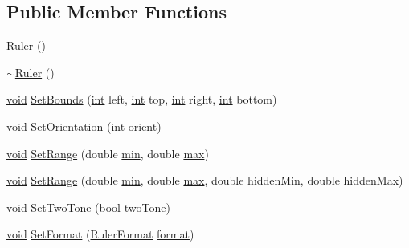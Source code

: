 \subsection*{Public Member Functions}
\begin{DoxyCompactItemize}
\item 
\hyperlink{class_ruler_a758f797ec166b06b7987f71d09c2a311}{Ruler} ()
\item 
\hyperlink{class_ruler_adfd931f9040a611cdc8f7bc75c819c60}{$\sim$\+Ruler} ()
\item 
\hyperlink{sound_8c_ae35f5844602719cf66324f4de2a658b3}{void} \hyperlink{class_ruler_ac0cd3f26225eb23922e5c6399b39a2aa}{Set\+Bounds} (\hyperlink{xmltok_8h_a5a0d4a5641ce434f1d23533f2b2e6653}{int} left, \hyperlink{xmltok_8h_a5a0d4a5641ce434f1d23533f2b2e6653}{int} top, \hyperlink{xmltok_8h_a5a0d4a5641ce434f1d23533f2b2e6653}{int} right, \hyperlink{xmltok_8h_a5a0d4a5641ce434f1d23533f2b2e6653}{int} bottom)
\item 
\hyperlink{sound_8c_ae35f5844602719cf66324f4de2a658b3}{void} \hyperlink{class_ruler_a6db8b4c35435ae7636fde05b7dbf3ce7}{Set\+Orientation} (\hyperlink{xmltok_8h_a5a0d4a5641ce434f1d23533f2b2e6653}{int} orient)
\item 
\hyperlink{sound_8c_ae35f5844602719cf66324f4de2a658b3}{void} \hyperlink{class_ruler_ad99f5a5adeeb2ca290a7df7760ded7bc}{Set\+Range} (double \hyperlink{_compare_audio_command_8cpp_abd8bbcfabb3ddef2ccaafb9928a37b95}{min}, double \hyperlink{_t_d_stretch_8cpp_ac39d9cef6a5e030ba8d9e11121054268}{max})
\item 
\hyperlink{sound_8c_ae35f5844602719cf66324f4de2a658b3}{void} \hyperlink{class_ruler_a60c861e603a79dad2f477d691423acc2}{Set\+Range} (double \hyperlink{_compare_audio_command_8cpp_abd8bbcfabb3ddef2ccaafb9928a37b95}{min}, double \hyperlink{_t_d_stretch_8cpp_ac39d9cef6a5e030ba8d9e11121054268}{max}, double hidden\+Min, double hidden\+Max)
\item 
\hyperlink{sound_8c_ae35f5844602719cf66324f4de2a658b3}{void} \hyperlink{class_ruler_afd1ca240bccbe577d26abe7177f09633}{Set\+Two\+Tone} (\hyperlink{mac_2config_2i386_2lib-src_2libsoxr_2soxr-config_8h_abb452686968e48b67397da5f97445f5b}{bool} two\+Tone)
\item 
\hyperlink{sound_8c_ae35f5844602719cf66324f4de2a658b3}{void} \hyperlink{class_ruler_ae26ec61780ad8b9a696a5125194355da}{Set\+Format} (\hyperlink{class_ruler_af58442bc79afc26e7b9f7735e1f6e198}{Ruler\+Format} \hyperlink{_export_p_c_m_8cpp_a317afff57d87a89158c2b038d37b2b08}{format})
\item 

\end{DoxyCompactItemize}
